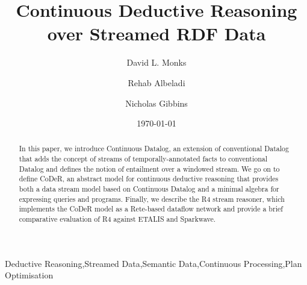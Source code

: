 \documentclass[twocolumn,preprint,3p,number]{elsarticle}
\theoremstyle{plain}
\theoremstyle{definition}
\begin{document}
\begin{frontmatter}
  \title{Continuous Deductive Reasoning over Streamed RDF Data}

  \author{David L. Monks}
  \author{Rehab Albeladi}
  \author{Nicholas Gibbins}
  \address{
            Electronics and Computer Science,\\
            University of Southampton,\\
            Southampton, SO17 1BJ,\\
            United Kingdom
  }

  \begin{abstract}
    In this paper, we introduce Continuous Datalog, an extension of
    conventional Datalog that adds the concept of streams of
    temporally-annotated facts to conventional Datalog and defines the
    notion of entailment over a windowed stream. We go on to define CoDeR,
    an abstract model for continuous deductive reasoning that provides
    both a data stream model based on Continuous Datalog and a minimal
    algebra for expressing queries and programs.  Finally, we describe the
    R4 stream reasoner, which implements the CoDeR model as a Rete-based
    dataflow network and provide a brief comparative evaluation of R4
    against ETALIS and Sparkwave.

  \end{abstract}

  \begin{keyword}
        Deductive Reasoning\sep Streamed Data\sep Semantic Data\sep Continuous Processing\sep Plan Optimisation
  \end{keyword}

  \date{\today}

\end{frontmatter}
\end{document}
